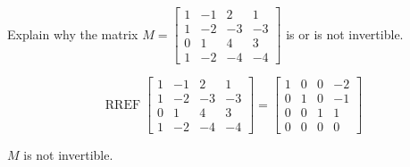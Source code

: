 
\begin{exerciseStatement}


Explain why the matrix \(M= \left[\begin{array}{cccc}
1 & -1 & 2 & 1 \\
1 & -2 & -3 & -3 \\
0 & 1 & 4 & 3 \\
1 & -2 & -4 & -4
\end{array}\right] \) is or is not invertible.


\end{exerciseStatement}
    
\begin{exerciseAnswer} 


\[\operatorname{RREF} \left[\begin{array}{cccc}
1 & -1 & 2 & 1 \\
1 & -2 & -3 & -3 \\
0 & 1 & 4 & 3 \\
1 & -2 & -4 & -4
\end{array}\right] = \left[\begin{array}{cccc}
1 & 0 & 0 & -2 \\
0 & 1 & 0 & -1 \\
0 & 0 & 1 & 1 \\
0 & 0 & 0 & 0
\end{array}\right] \]

\(M\) is not invertible.
\end{exerciseAnswer}
    
